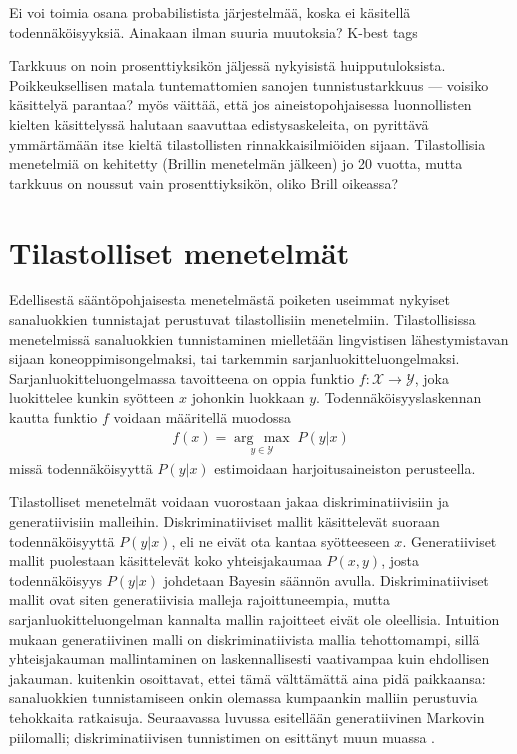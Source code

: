\documentclass[utf8,bachelor,manualbib]{gradu3}
\newcommand{\argmax}[1]{\underset{#1}{\operatorname{arg}\,\operatorname{max}}\;}
\begin{document}
Ei voi toimia osana probabilistista järjestelmää, koska ei käsitellä todennäköisyyksiä. Ainakaan ilman suuria muutoksia? K-best tags \citep{brill1995}

Tarkkuus on noin prosenttiyksikön jäljessä nykyisistä huipputuloksista. Poikkeuksellisen matala tuntemattomien sanojen tunnistustarkkuus --- voisiko käsittelyä parantaa? \citet{brill1995} myös väittää, että jos aineistopohjaisessa luonnollisten kielten käsittelyssä halutaan saavuttaa edistysaskeleita, on pyrittävä ymmärtämään itse kieltä tilastollisten rinnakkaisilmiöiden sijaan. Tilastollisia menetelmiä on kehitetty (Brillin menetelmän jälkeen) jo 20 vuotta, mutta tarkkuus on noussut vain prosenttiyksikön, oliko Brill oikeassa? \citep{manning2011} 


\chapter{Tilastolliset menetelmät}

Edellisestä sääntöpohjaisesta menetelmästä poiketen useimmat nykyiset sanaluokkien tunnistajat perustuvat tilastollisiin menetelmiin. Tilastollisissa menetelmissä sanaluokkien tunnistaminen mielletään lingvistisen lähestymistavan sijaan koneoppimisongelmaksi, tai tarkemmin sarjanluokitteluongelmaksi. Sarjanluokitteluongelmassa tavoitteena on oppia funktio $f: \mathcal{X} \to \mathcal{Y}$, joka luokittelee kunkin syötteen $x$ johonkin luokkaan $y$. Todennäköisyyslaskennan kautta funktio $f$ voidaan määritellä muodossa
\begin{align}
f(x) = \argmax{y \in \mathcal{Y}} P(y|x)
\end{align}
missä todennäköisyyttä $P(y|x)$ estimoidaan harjoitusaineiston perusteella.

Tilastolliset menetelmät voidaan vuorostaan jakaa diskriminatiivisiin ja generatiivisiin malleihin. Diskriminatiiviset mallit käsittelevät suoraan todennäköisyyttä $P(y|x)$, eli ne eivät ota kantaa syötteeseen $x$. Generatiiviset mallit puolestaan käsittelevät koko yhteisjakaumaa $P(x,y)$, josta todennäköisyys $P(y|x)$ johdetaan Bayesin säännön avulla. Diskriminatiiviset mallit ovat siten generatiivisia malleja rajoittuneempia, mutta sarjanluokitteluongelman kannalta mallin rajoitteet eivät ole oleellisia. Intuition mukaan generatiivinen malli on diskriminatiivista mallia tehottomampi, sillä yhteisjakauman mallintaminen on laskennallisesti vaativampaa kuin ehdollisen jakauman.  kuitenkin osoittavat, ettei tämä välttämättä aina pidä paikkaansa: sanaluokkien tunnistamiseen onkin olemassa kumpaankin malliin perustuvia tehokkaita ratkaisuja. Seuraavassa luvussa esitellään generatiivinen Markovin piilomalli; diskriminatiivisen tunnistimen on esittänyt muun muassa \citet{ratnaparkhi1996}.
\end{document}

